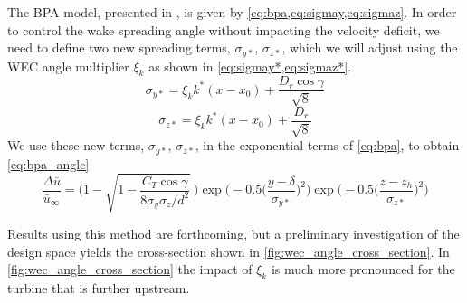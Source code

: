 \documentclass[a4paper]{jpconf}
\begin{document}
The BPA model, presented in \cite{bastankhah2016}, is given by \cref{eq:bpa,eq:sigmay,eq:sigmaz}. In order to control the wake spreading angle without impacting the velocity deficit, we need to define two new spreading terms, $\sigma_{y*}$, $\sigma_{z*}$, which we will adjust using the WEC angle multiplier $\xi_k$ as shown in \cref{eq:sigmay*,eq:sigmaz*}.
\begin{equation}\label{eq:sigmay*}
\sigma_{y*} = \xi_k k^* (x - x_0) + \frac{D_r \cos{\gamma}}{\sqrt{8}}
\end{equation}
%
\begin{equation}\label{eq:sigmaz*}
\sigma_{z*} = \xi_k k^* (x - x_0) + \frac{D_r}{\sqrt{8}}
\end{equation}
%
We use these new terms, $\sigma_{y*}$, $\sigma_{z*}$, in the exponential terms of \cref{eq:bpa}, to obtain \cref{eq:bpa_angle}
\begin{equation}
\frac{\Delta \bar{u}}{\bar{u}_{\infty}} = \Bigg(1-\sqrt{1-\frac{C_T \cos{\gamma}}{8 \sigma_y \sigma_z/d^2}}~\Bigg) \exp{\bigg(-0.5\Big(\frac{y-\delta}{\sigma_{y*}}\Big)^2\bigg)}\exp{\bigg(-0.5\Big(\frac{z-z_h}{\sigma_{z*}}\Big)^2\bigg)}
\label{eq:bpa_angle}
\end{equation}

Results using this method are forthcoming, but a preliminary investigation of the design space yields the cross-section shown in \cref{fig:wec_angle_cross_section}. In \cref{fig:wec_angle_cross_section} the impact of $\xi_k$ is much more pronounced for the turbine that is further upstream. 
\end{document}
